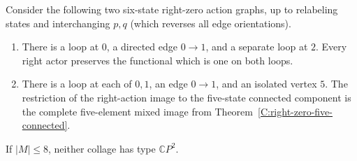 \begin{proposition}
\label{C:right-zero-six-disconnected-controls}
Consider the following two six-state right-zero action graphs,
up to relabeling states and interchanging $p,q$ (which reverses
all edge orientations).
\begin{enumerate}
\item There is a loop at $0$, a directed edge $0\to1$, and a
separate loop at $2$.  Every right actor preserves the functional
which is one on both loops.
\item There is a loop at each of $0,1$, an edge $0\to1$, and an
isolated vertex $5$.  The restriction of the right-action image
to the five-state connected component is the complete five-element
mixed image from Theorem~\ref{C:right-zero-five-connected}.
\end{enumerate}
If $|M|\leq8$, neither collage has type $\mathbb CP^2$.
\end{proposition}
